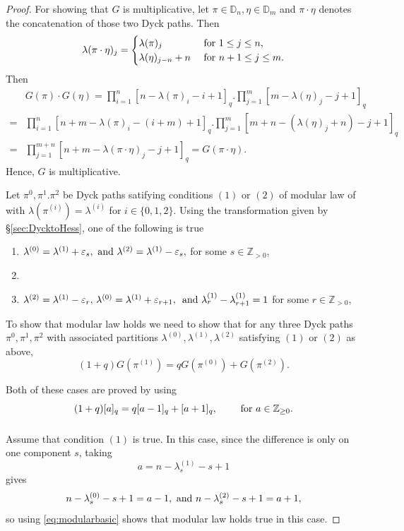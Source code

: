 \documentclass[12pt,reqno]{amsart}
\theoremstyle{plain}
\theoremstyle{definition}
\theoremstyle{remark}
\theoremstyle{example}
\numberwithin{equation}{section}
\newcommand\ZZ{\mathbb{Z}}
\newcommand{\DD}{\mathbb{D}}
\begin{document}
\begin{proof}
	For showing that $G$ is multiplicative, let $\pi \in \DD_n,\eta \in \DD_m$ and $\pi\cdot\eta$ denotes the concatenation of those two Dyck paths. Then $$ \lambda(\pi \cdot \eta)_j = \begin{cases}
		\lambda(\pi)_j &\hbox{ for } 1 \leq j \leq n,
		\\
		\lambda(\eta)_{j-n}+n &\hbox{ for } n+1 \leq j \leq m.
	\end{cases}$$ 
	Then
	\begin{align*}
		&G(\pi)\cdot G(\eta)=
		\prod_{i=1}^{n}[n-\lambda(\pi)_{i}-i+1]_{q}.\prod_{j=1}^{m}[m-\lambda(\eta)_{j}-j+1]_{q}\\
		=&\prod_{i=1}^{n}[n+m-\lambda(\pi)_{i}-(i+m)+1]_{q}.\prod_{j=1}^{m}[m+n-(\lambda(\eta)_{j}+n)-j+1]_{q}\\
		=&\prod_{j=1}^{m+n}[n+m-\lambda(\pi\cdot \eta)_{j}-j+1]_{q} = G(\pi \cdot \eta).
	\end{align*}
	Hence, $G$ is multiplicative. 
	
	Let $\pi^0, \pi^1. \pi^2$ be Dyck paths satifying conditions $(1)$ or $(2)$ of modular law of \cite[Definition 2.1]{Abreu_Nigro_csfmodular} with $\lambda(\pi^{(i)}) = \lambda^{(i)}$ for $i \in \{0,1,2\}$. Using the transformation given by \S\ref{sec:DycktoHess}, one of the following is true \begin{enumerate}
		\item[(1)] $\lambda^{(0)} = \lambda^{(1)} + \varepsilon_s, \hbox{ and } \lambda^{(2)} = \lambda^{(1)}-\varepsilon_s,$ for some $s\in \ZZ_{>0}$,
		\item[or,] 
		\item[(2)] $
		\lambda^{(2)} = \lambda^{(1)} - \varepsilon_r,\, \lambda^{(0)} = \lambda^{(1)} + \varepsilon_{r+1},\, \hbox{ and } \lambda^{(1)}_r - \lambda^{(1)}_{r+1} = 1$ for some $r \in \ZZ_{>0}$,
	\end{enumerate} 
To show that modular law holds we need to show that for any three Dyck paths $\pi^0,\pi^1,\pi^2$ with associated partitions $\lambda^{(0)},\lambda^{(1)},\lambda^{(2)}$ satisfying $(1)$ or $(2)$ as above, 
$$(1+q)G(\pi^{(1)})=qG(\pi^{(0)})+G(\pi^{(2)}).$$ 

Both of these cases are proved by using \begin{equation}\label{eq:modularbasic}
	(1+q)[a]_{q} = q[a-1]_{q} + [a+1]_{q}, \qquad \hbox{ for } a \in \ZZ_{\geq 0}.
\end{equation} $$ 	$$

Assume that condition $(1)$ is true. In this case, since the difference is only on one component $s$, taking $$a = n - \lambda^{(1)}_s - s +1$$ gives $$ n - \lambda^{(0)}_{s} - s +1 = a-1, \hbox{ and } n - \lambda^{(2)}_{s} - s +1 = a+1,$$ so using \eqref{eq:modularbasic} shows that modular law holds true in this case.



\end{proof}
\end{document}
